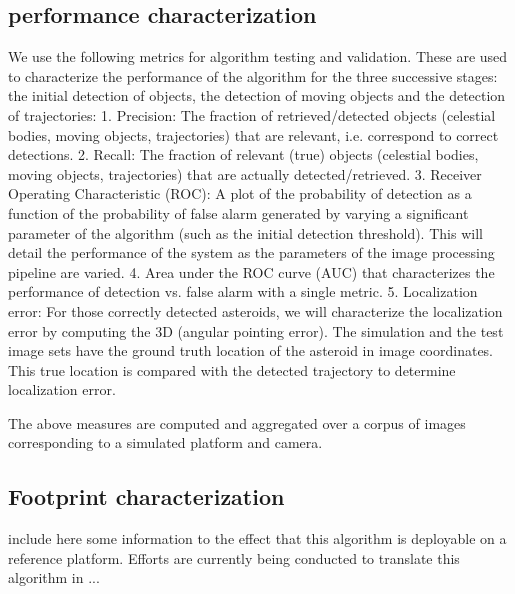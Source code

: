 \subsection{performance characterization}
We use the following metrics for algorithm testing and validation.  These are used to characterize the performance of the algorithm for the three successive stages: the initial detection of objects, the detection of moving objects and the detection of trajectories:
1.	Precision: The fraction of retrieved/detected objects (celestial bodies, moving objects, trajectories) that are relevant, i.e. correspond to correct detections.
2.	Recall: The fraction of relevant (true) objects (celestial bodies, moving objects, trajectories) that are actually detected/retrieved.
3.	Receiver Operating Characteristic (ROC): A plot of the probability of detection as a function of the probability of false alarm generated by varying a significant parameter of the algorithm (such as the initial detection threshold).  This will detail the performance of the system as the parameters of the image processing pipeline are varied. 
4.	Area under the ROC curve (AUC) that characterizes the performance of detection vs. false alarm with a single metric.
5.	Localization error: For those correctly detected asteroids, we will characterize the localization error by computing the 3D (angular pointing error).  The simulation and the test image sets have the ground truth location of the asteroid in image coordinates.  This true location is compared with the detected trajectory to determine localization error.

The above measures are computed and aggregated over a corpus of images corresponding to a simulated platform and camera.
\subsection{Footprint characterization}
include here some information to the effect that this algorithm is deployable on a reference platform.
Efforts are currently being conducted to translate this algorithm in ...